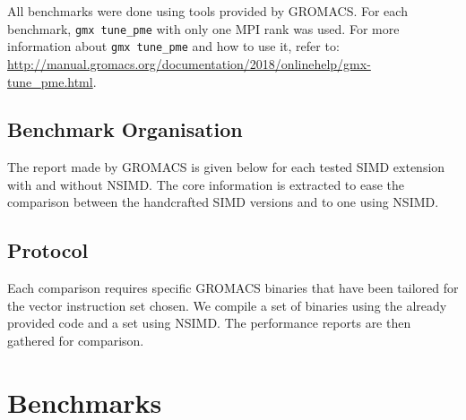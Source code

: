 \documentclass[a4paper,11pt]{article}
\newcommand{\gromacs}{GROMACS}
\newcommand{\nsimd}{NSIMD}
\begin{document}
All benchmarks were done using tools provided by \gromacs{}. For each benchmark, \texttt{gmx tune\_pme} with only one MPI rank was used. For more information about \texttt{gmx tune\_pme} and how to use it, refer to:
\href{http://manual.gromacs.org/documentation/2018/onlinehelp/gmx-tune_pme.html}{http://manual.\allowbreak{}gromacs.org/documentation/2018/onlinehelp/gmx-tune\_pme.html}.

\subsection{Benchmark Organisation}

The report made by \gromacs{} is given below for each tested SIMD extension with and without \nsimd{}. The core information is extracted to ease the comparison between the handcrafted SIMD versions and to one using \nsimd{}.

\subsection{Protocol}

Each comparison requires specific \gromacs{} binaries that have been tailored for the vector instruction set chosen. We compile a set of binaries using the already provided code and a set using \nsimd{}. The performance reports are then gathered for comparison.



\renewcommand{\subsectionmark}[1]{\markright{#1}}
\fancyhf[HR]{\rightmark}

\section{Benchmarks}
\end{document}

